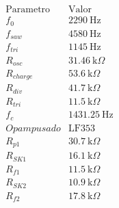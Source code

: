 \documentclass[11pt,letterpaper]{article}
\begin{document}
\[
\begin{array}{c|c}
\text{Parametro} & \text{Valor} \\
\hline
f_0 & 2290~\text{Hz}\\
f_{saw} & 4580~\text{Hz}\\
f_{tri} & 1145~\text{Hz}\\
R_{osc} & 31.46~\text{k}\Omega\\
R_{charge} & 53.6~\text{k}\Omega\\
R_{div} & 41.7~\text{k}\Omega\\
R_{tri} & 11.5~\text{k}\Omega\\
f_c & 1431.25~\text{Hz}\\
Opamp usado & \text{LF353}\\
R_{p1} & 30.7~\text{k}\Omega\\
R_{SK1} & 16.1~\text{k}\Omega\\
R_{f1} & 11.5~\text{k}\Omega\\
R_{SK2} & 10.9~\text{k}\Omega\\
R_{f2} & 17.8~\text{k}\Omega
\end{array}
\]
\end{document}
